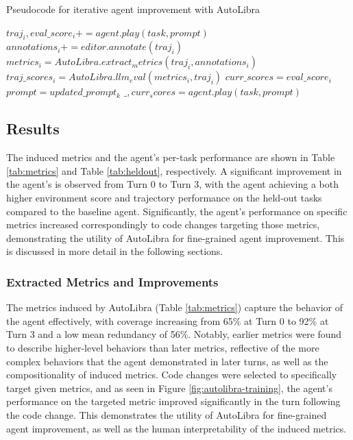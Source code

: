 \begin{algorithm}
    \caption{Pseudocode for iterative agent improvement with AutoLibra}
    \begin{algorithmic}[1]
            \State $traj_i, eval\_score_i += agent.play(task, prompt)$
            \State $annotations_i += editor.annotate(traj_i)$
        \EndFor
        \State $metrics_i = AutoLibra.extract_metrics(traj_i, annotations_i)$
        \State $traj\_scores_i = AutoLibra.llm_eval(metrics_i, traj_i)$
        \State $curr\_scores = eval\_score_i$
            \State $prompt = updated\_prompt_k$
                \State $\_, curr_scores = agent.play(task, prompt)$
            \EndFor
        \EndWhile
    \EndFor

    \end{algorithmic}
    \label{algo1}
\end{algorithm}




\subsection{Results}

The induced metrics and the agent's per-task performance are shown in Table \ref{tab:metrics} and Table \ref{tab:heldout}, respectively. A significant improvement in the agent's is observed from Turn 0 to Turn 3, with the agent achieving a both higher environment score and trajectory performance on the held-out tasks compared to the baseline agent. Significantly, the agent's performance on specific metrics increased correspondingly to code changes targeting those metrics, demonstrating the utility of AutoLibra for fine-grained agent improvement. This is discussed in more detail in the following sections.

\subsubsection{Extracted Metrics and Improvements}
The metrics induced by AutoLibra (Table \ref{tab:metrics}) capture the behavior of the agent effectively, with coverage increasing from 65\% at Turn 0 to 92\% at Turn 3 and a low mean redundancy of 56\%. Notably, earlier metrics were found to describe higher-level behaviors than later metrics, reflective of the more complex behaviors that the agent demonstrated in later turns, as well as the compositionality of induced metrics. Code changes were selected to specifically target given metrics, and as seen in Figure \ref{fig:autolibra-training}, the agent's performance on the targeted metric improved significantly in the turn following the code change. This demonstrates the utility of AutoLibra for fine-grained agent improvement, as well as the human interpretability of the induced metrics.

